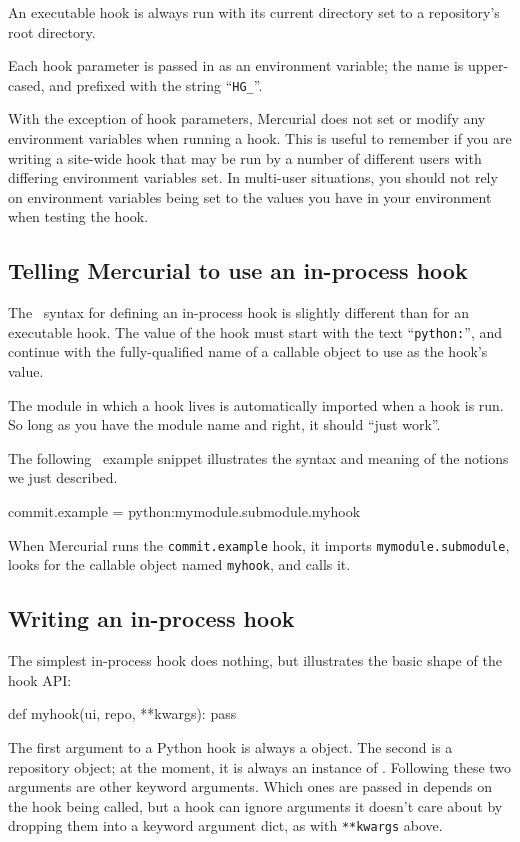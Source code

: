 An executable hook is always run with its current directory set to a
repository's root directory.

Each hook parameter is passed in as an environment variable; the name
is upper-cased, and prefixed with the string ``\texttt{HG\_}''.

With the exception of hook parameters, Mercurial does not set or
modify any environment variables when running a hook.  This is useful
to remember if you are writing a site-wide hook that may be run by a
number of different users with differing environment variables set.
In multi-user situations, you should not rely on environment variables
being set to the values you have in your environment when testing the
hook.

\subsection{Telling Mercurial to use an in-process hook}

The \hgrc\ syntax for defining an in-process hook is slightly
different than for an executable hook.  The value of the hook must
start with the text ``\texttt{python:}'', and continue with the
fully-qualified name of a callable object to use as the hook's value.

The module in which a hook lives is automatically imported when a hook
is run.  So long as you have the module name and 
right, it should ``just work''.

The following \hgrc\ example snippet illustrates the syntax and
meaning of the notions we just described.
\begin{codesample2}
  [hooks]
  commit.example = python:mymodule.submodule.myhook
\end{codesample2}
When Mercurial runs the \texttt{commit.example} hook, it imports
\texttt{mymodule.submodule}, looks for the callable object named
\texttt{myhook}, and calls it.

\subsection{Writing an in-process hook}

The simplest in-process hook does nothing, but illustrates the basic
shape of the hook API:
\begin{codesample2}
  def myhook(ui, repo, **kwargs):
      pass
\end{codesample2}
The first argument to a Python hook is always a
 object.  The second is a repository object;
at the moment, it is always an instance of
.  Following these two
arguments are other keyword arguments.  Which ones are passed in
depends on the hook being called, but a hook can ignore arguments it
doesn't care about by dropping them into a keyword argument dict, as
with \texttt{**kwargs} above.

